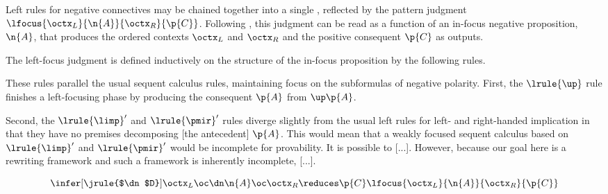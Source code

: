 Left rules for negative connectives may be chained together into a single , reflected by the pattern judgment $\lfocus{\octx_L}{\n{A}}{\octx_R}{\p{C}}$.
Following \textcite{Zeilberger:??}, this judgment can be read as a function of an in-focus negative proposition, $\n{A}$, that produces the ordered contexts $\octx_L$ and $\octx_R$ and the positive consequent $\p{C}$ as outputs.

The left-focus judgment is defined inductively on the structure of the in-focus proposition by the following rules.
These rules parallel the usual sequent calculus rules, maintaining focus on the subformulas of negative polarity.
First, the $\lrule{\up}$ rule finishes a left-focusing phase by producing the consequent $\p{A}$ from $\up \p{A}$.

Second, the $\lrule{\limp}'$ and $\lrule{\pmir}'$ rules diverge slightly from the usual left rules for left- and right-handed implication in that they have no premises decomposing [the antecedent] $\p{A}$.
This would mean that a weakly focused sequent calculus based on $\lrule{\limp}'$ and $\lrule{\pmir}'$ would be incomplete for provability.
It is possible to [...]\autocite{Simmons:CMU??}.
However, because our goal here is a rewriting framework and such a framework is inherently incomplete, [...].


\begin{equation*}
  \infer[\jrule{$\dn$D}]{\octx_L \oc \dn \n{A} \oc \octx_R \reduces \p{C}}{
    \lfocus{\octx_L}{\n{A}}{\octx_R}{\p{C}}}
\end{equation*}

